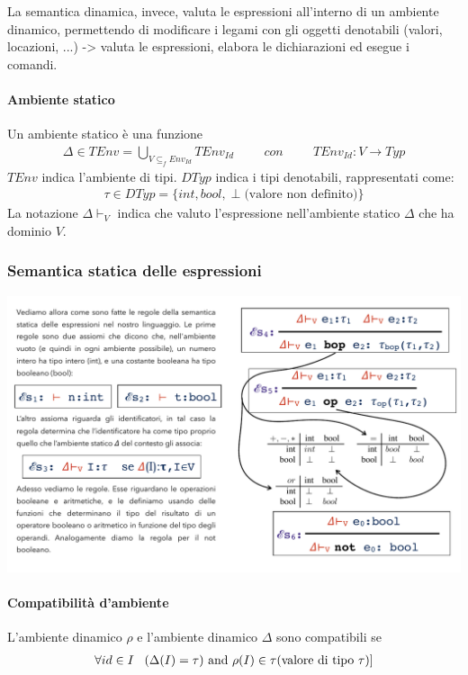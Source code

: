\documentclass[a4paper, 10pt]{report}
\begin{document}
\noindent La semantica dinamica, invece, valuta le espressioni all'interno di un ambiente dinamico, permettendo di modificare i legami con gli oggetti denotabili (valori, locazioni, ...) -> valuta le espressioni, elabora le dichiarazioni ed esegue i comandi.

\paragraph*{Ambiente statico} Un ambiente statico è una funzione
\begin{align*}
\Delta \in TEnv = \bigcup_{V \subseteq_f Env_{Id}}TEnv_{Id} \hspace{1cm} con \hspace{1cm} TEnv_{Id}: V \rightarrow Typ
\end{align*}
\noindent $TEnv$ indica l'ambiente di tipi. $DTyp$ indica i tipi denotabili, rappresentati come:
\begin{align*}
\tau \in DTyp = \{int , bool, \perp \text{(valore non definito)}\}
\end{align*}
\noindent La notazione $\Delta \vdash_V$ indica che valuto l'espressione nell'ambiente statico $\Delta$ che ha dominio $V$.

\subsubsection*{Semantica statica delle espressioni}
\begin{center}
\includegraphics[scale=0.8]{1.pdf}
\end{center}

\paragraph*{Compatibilità d'ambiente} L'ambiente dinamico $\rho$ e l'ambiente dinamico $\Delta$ sono compatibili se 
\begin{align*}
\forall id \in I \hspace{0.3cm}(\Delta(I) = \tau) \text{ and } \rho(I) \in \tau \text{(valore di tipo $\tau$)}]
\end{align*}
\end{document}
